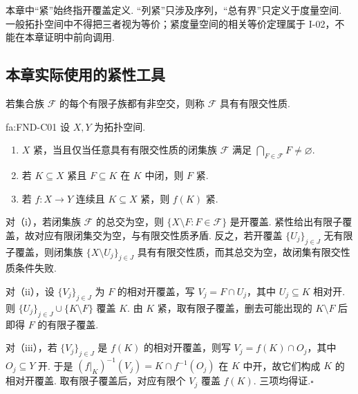 \begin{FAWarning}[紧、列紧、总有界不可混用]
本章中“紧”始终指开覆盖定义. “列紧”只涉及序列，“总有界”只定义于度量空间. 一般拓扑空间中不得把三者视为等价；紧度量空间的相关等价定理属于 I-02，不能在本章证明中前向调用.
\end{FAWarning}

\subsection{本章实际使用的紧性工具}

若集合族 \(\displaystyle \mathcal F\) 的每个有限子族都有非空交，则称 \(\displaystyle \mathcal F\) 具有有限交性质.

\begin{FAProposition}[C][拓扑基础工具集]{fa:FND-C01}
设 \(\displaystyle X,Y\) 为拓扑空间.
\begin{enumerate}[label=\textup{(\roman*)}]
\item \(\displaystyle X\) 紧，当且仅当任意具有有限交性质的闭集族 \(\displaystyle \mathcal F\) 满足 \(\displaystyle \bigcap_{F\in\mathcal F}F\neq\varnothing\).
\item 若 \(\displaystyle K\subseteq X\) 紧且 \(\displaystyle F\subseteq K\) 在 \(\displaystyle K\) 中闭，则 \(\displaystyle F\) 紧.
\item 若 \(\displaystyle f:X\to Y\) 连续且 \(\displaystyle K\subseteq X\) 紧，则 \(\displaystyle f(K)\) 紧.
\end{enumerate}
\end{FAProposition}

\begin{FAProof}
对（i），若闭集族 \(\displaystyle \mathcal F\) 的总交为空，则 \(\displaystyle \{X\setminus F:F\in\mathcal F\}\) 是开覆盖. 紧性给出有限子覆盖，故对应有限闭集交为空，与有限交性质矛盾. 反之，若开覆盖 \(\displaystyle \{U_j\}_{j\in J}\) 无有限子覆盖，则闭集族 \(\displaystyle \{X\setminus U_j\}_{j\in J}\) 具有有限交性质，而其总交为空，故闭集有限交性质条件失败.

对（ii），设 \(\displaystyle \{V_j\}_{j\in J}\) 为 \(\displaystyle F\) 的相对开覆盖，写 \(\displaystyle V_j=F\cap U_j\)，其中 \(\displaystyle U_j\subseteq K\) 相对开. 则 \(\displaystyle \{U_j\}_{j\in J}\cup\{K\setminus F\}\) 覆盖 \(\displaystyle K\). 由 \(\displaystyle K\) 紧，取有限子覆盖，删去可能出现的 \(\displaystyle K\setminus F\) 后即得 \(\displaystyle F\) 的有限子覆盖.

对（iii），若 \(\displaystyle \{V_j\}_{j\in J}\) 是 \(\displaystyle f(K)\) 的相对开覆盖，则写 \(\displaystyle V_j=f(K)\cap O_j\)，其中 \(\displaystyle O_j\subseteq Y\) 开. 于是 \(\displaystyle (f|_K)^{-1}(V_j)=K\cap f^{-1}(O_j)\) 在 \(\displaystyle K\) 中开，故它们构成 \(\displaystyle K\) 的相对开覆盖. 取有限子覆盖后，对应有限个 \(\displaystyle V_j\) 覆盖 \(\displaystyle f(K)\). 三项均得证.\hfill\(\square\)
\end{FAProof}

